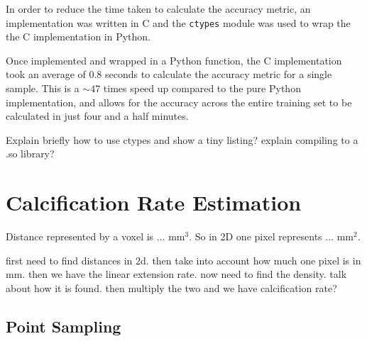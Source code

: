 In order to reduce the time taken to calculate the accuracy metric, an implementation was written in C and the \texttt{ctypes} module was used to wrap the the C implementation in Python. 

Once implemented and wrapped in a Python function, the C implementation took an average of 0.8 seconds to calculate the accuracy metric for a single sample. This is a ${\sim}47$ times speed up compared to the pure Python implementation, and allows for the accuracy across the entire training set to be calculated in just four and a half minutes.

Explain briefly how to use ctypes and show a tiny listing? explain compiling to a .so library?

\section{Calcification Rate Estimation}

Distance represented by a voxel is ... mm$^3$. So in 2D one pixel represents ... mm$^2$. 

first need to find distances in 2d. then take into account how much one pixel is in mm. then we have the linear extension rate. now need to find the density. talk about how it is found. then multiply the two and we have calcification rate?

\subsection{Point Sampling}